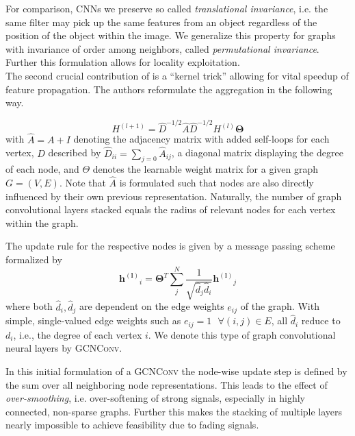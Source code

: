 \documentclass[]{article}
\begin{document}
For comparison, CNNs we preserve so called \textit{translational invariance}, i.e. the same filter may pick up the same features from an object regardless of the position of the object within the image. We generalize this property for graphs with invariance of order among neighbors, called \textit{permutational invariance}. Further this formulation allows for locality exploitation.\\


The second crucial contribution of \citet{GCNConv} is a ``kernel trick'' allowing for vital speedup of feature propagation. The authors reformulate the aggregation in the following way. 

\begin{equation}
	H^{(l+1)} = \widehat{D}^{-1/2} \widehat{A}
	\widehat{D}^{-1/2} H^{(l)} \mathbf{\Theta}
\end{equation}
with $\hat{A} = A + I$ denoting the
adjacency matrix with added self-loops for each vertex, $D$ described by $\widehat{D}_{ii} = \sum_{j=0} \widehat{A}_{ij}$, a diagonal
matrix displaying the degree of each node, and $\Theta$ denotes the
learnable weight matrix for a given graph $G=(V,E)$.
Note that $\hat{A}$ is formulated such that nodes are also directly influenced by their own previous representation.
Naturally, the number of graph convolutional layers stacked equals the radius of
relevant nodes for each vertex within the graph.

The update rule for the respective nodes is given by a message passing scheme
formalized by
\begin{equation}
	\mathbf{h^{(l)}}_i = \mathbf{\Theta}^T \sum^{N}_{j}
	\frac{1}{\sqrt{\hat{d}_j \hat{d}_i}} \mathbf{h^{(l)}}_j
\end{equation}
where both $\hat{d}_i, \hat{d}_j$ are dependent on the edge weights
$e_{ij}$ of the graph. With simple, single-valued edge weights such as
$e_{ij}=1 \text{ }\forall (i,j)\in E$, all $\hat{d}_i$ reduce to
$d_i$, i.e., the degree of each vertex $i$. We denote this type of
graph convolutional neural layers by \textsc{GCNConv}.

In this initial formulation of a \textsc{GCNConv} the node-wise update
step is defined by the sum over all neighboring node representations. This leads to the effect of \textit{over-smoothing}, i.e. over-softening of strong signals, especially in highly connected, non-sparse graphs. Further this makes the stacking of multiple layers nearly impossible to achieve feasibility due to fading signals.\\
\end{document}
